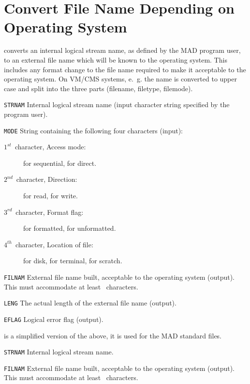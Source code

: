 \section{Convert File Name Depending on Operating System}
\label{FLNFIX}
converts an internal logical stream name,
as defined by the MAD program user,
to an external file name which will be known to the operating system.
This includes any format change to the file name required to make it
acceptable to the operating system.
On VM/CMS systems, e.~g. the name is converted to upper case and split
into the three parts (filename, filetype, filemode).
\begin{mylist}
\item[\tt STRNAM]
Internal logical stream name (input character string specified by
the program user).
\item[\tt MODE]
String containing the following four characters (input):
\begin{description}
\item[$1^{st}$~character, Access mode:]
 for sequential,  for direct.
\item[$2^{nd}$~character, Direction:]
 for read,  for write.
\item[$3^{rd}$~character, Format flag:]
 for formatted,  for unformatted.
\item[$4^{th}$~character, Location of file:]
 for disk,  for terminal,  for scratch.
\end{description}
\item[\tt FILNAM]
External file name built, acceptable to the operating system (output).
This must accommodate at least ~characters.
\item[\tt LENG]
The actual length of the external file name (output).
\item[\tt EFLAG]
Logical error flag (output).
\end{mylist}

is a simplified version of the above,
it is used for the MAD standard files.
\begin{mylist}
\item[\tt STRNAM]
Internal logical stream name.
\item[\tt FILNAM]
External file name built, acceptable to the operating system (output).
This must accommodate at least ~characters.
\end{mylist}

